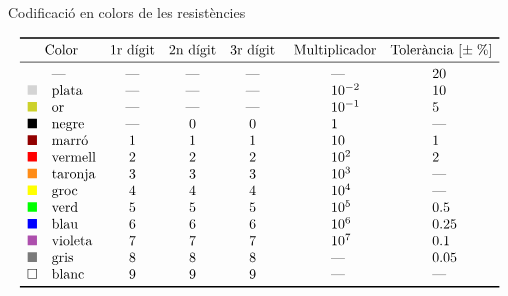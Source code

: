 \begin{table}[htb]
   \caption{Codificaci\'{o} en colors de les resist\`{e}ncies}
   \[ \begin{array}{llccc>{\hspace{3em}}l>{\hspace{3em}}l}
   \toprule[1pt]
   \multicolumn{2}{c}{\text{Color}} & \text{1r d\'{\i}git} & \text{2n d\'{\i}git} & \text{3r d\'{\i}git} & \multicolumn{1}{c}{\text{
   Multiplicador}} & \multicolumn{1}{c}{\text{Toler\`{a}ncia }[\pm\;\%]}
   \\
   \midrule
           &\text{---}     &  \text{---} &  \text{---} &  \text{---} &  \text{---} & 20 \\
   \textcolor[rgb]{0.83,0.83,0.83}{\blacksquare} &\text{plata}   &  \text{---} &  \text{---} &  \text{---} &  10^{-2} & 10 \\
   \textcolor[rgb]{0.80,0.82,0.17}{\blacksquare} &\text{or}      &  \text{---} &  \text{---} &  \text{---} &  10^{-1} & 5 \\
   \blacksquare &\text{negre}   &  \text{---}   &  0   &  0   &  1   & \text{---} \\
   \textcolor[rgb]{0.57,0.00,0.00}{\blacksquare} &\text{marr\'{o}}   &  1   &  1   &  1   &  10   & 1 \\
   \textcolor[rgb]{1.00,0.00,0.00}{\blacksquare} &\text{vermell} &  2   &  2   &  2   &  10^2   & 2 \\
   \textcolor[rgb]{1.00,0.55,0.09}{\blacksquare} &\text{taronja} &  3   &  3   &  3   &  10^3   & \text{---} \\
   \textcolor[rgb]{1.00,1.00,0.00}{\blacksquare} &\text{groc}    &  4   &  4   &  4   &  10^4   & \text{---} \\
   \textcolor[rgb]{0.00,1.00,0.00}{\blacksquare} &\text{verd}    &  5   &  5   &  5   &  10^5   & \num{0,5} \\
   \textcolor[rgb]{0.00,0.00,1.00}{\blacksquare} &\text{blau}    &  6   &  6   &  6   &  10^6   & \num{0,25} \\
   \textcolor[rgb]{0.68,0.31,0.68}{\blacksquare} &\text{violeta} &  7   &  7   &  7   &  10^7   & \num{0,1} \\
   \textcolor[rgb]{0.48,0.48,0.48}{\blacksquare} &\text{gris}    &  8   &  8   &  8   &  \text{---}   & \num{0,05} \\
   \square &\text{blanc}   &  9   &  9   &  9   &  \text{---}   & \text{---} \\
   \bottomrule[1pt]
   \end{array}   \]
\end{table}

